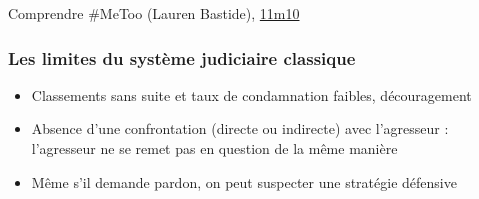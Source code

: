 \documentclass[french]{beamer}
\begin{document}
\begin{frame}
\begin{block}{Comprendre \#MeToo (Lauren Bastide), \href{https://podcasts.musixmatch.com/podcast/01gz0dx010r13t2j6yymscmvrf/episode/01gz0dx010r13t2j6yymscmvrp?time=670.945}{11m10}}
\begin{quote}
    \end{quote}
  \end{block}
\end{frame}

\begin{frame}
  \frametitle{Les limites du système judiciaire classique}
  \begin{itemize}
    \item Classements sans suite et taux de condamnation faibles, découragement
    \item Absence d’une confrontation (directe ou indirecte) avec l’agresseur : l’agresseur ne se remet pas en question de la même manière
    \item Même s’il demande pardon, on peut suspecter une stratégie défensive
  \end{itemize}
\end{frame}
\end{document}
